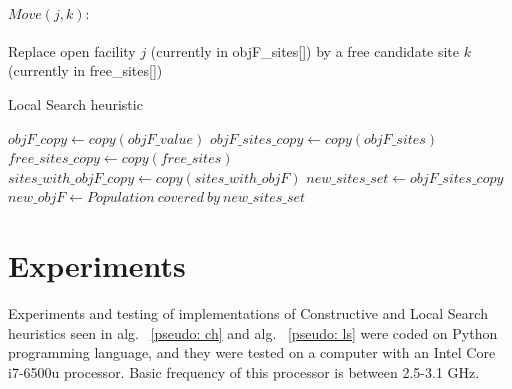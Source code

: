 \documentclass[11pt, a4paper]{article}
\begin{document}
\paragraph{$Move(j,k):$}
Replace open facility $j$ (currently in objF\_sites[]) by a free candidate site $k$ (currently in free\_sites[]) 

\begin{algorithm}
	\caption{Local Search heuristic}\label{pseudo: ls}
	\SetAlgoLined
	\DontPrintSemicolon

	\KwResult{}
	$objF\_copy \gets copy(objF\_value)$\;
	$objF\_sites\_copy \gets copy(objF\_sites)$\;
	$free\_sites\_copy \gets copy(free\_sites)$\;
	$sites\_with\_objF\_copy \gets copy(sites\_with\_objF)$\;
	\BlankLine
	\BlankLine
	\BlankLine
	\BlankLine
	$new\_sites\_set \gets objF\_sites\_copy$\;
	$new\_objF \gets Population \ covered \ by \ new\_sites\_set$\;
	\BlankLine
\end{algorithm}

\section{Experiments}
Experiments and testing of implementations of Constructive and Local Search heuristics seen in alg. ~\ref{pseudo: ch} and alg. ~\ref{pseudo: ls} were coded on Python programming language, and they were tested on a computer with an Intel Core i7-6500u processor. Basic frequency of this processor is between 2.5-3.1 GHz.
\end{document}
